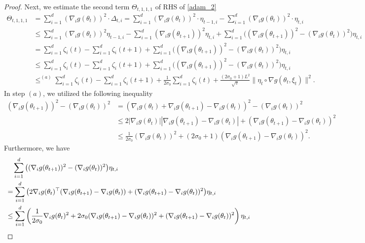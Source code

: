 \documentclass[standalone]{article}
\begin{document}
\begin{proof}
Next, we estimate the second term \(\Theta_{t,1,1,1}\) of RHS of \cref{adam_2}
\begin{align*}
\Theta_{t,1,1,1}&=\sum_{i=1}^{d}(\nabla_{i}g(\theta_{t}))^{2}\cdot\Delta_{t,i}=\sum_{i=1}^{d}(\nabla_{i}g(\theta_{t}))^{2}\cdot\eta_{{t-1},i}-\sum_{i=1}^{d}(\nabla_{i}g(\theta_{t}))^{2}\cdot\eta_{t,i}\\&\le \sum_{i=1}^{d}(\nabla_{i}g(\theta_{t}))^{2}\eta_{{t-1},i}-\sum_{i=1}^{d}(\nabla_{i}g(\theta_{t+1}))^{2}\eta_{t,i}+\sum_{i=1}^{d}\big((\nabla_{i}g(\theta_{t+1}))^{2}-(\nabla_{i}g(\theta_{t}))^{2}\big)\eta_{t,i}\\&=\sum_{i=1}^{d}\zeta_{i}(t)-\sum_{i=1}^{d}\zeta_{i}(t+1)+\sum_{i=1}^{d}\big((\nabla_{i}g(\theta_{t+1}))^{2}-(\nabla_{i}g(\theta_{t}))^{2}\big)\eta_{t,i}\\&\le \sum_{i=1}^{d}\zeta_{i}(t)-\sum_{i=1}^{d}\zeta_{i}(t+1)+\sum_{i=1}^{d}\big((\nabla_{i}g(\theta_{t+1}))^{2}-(\nabla_{i}g(\theta_{t}))^{2}\big)\eta_{t,i}\\&\mathop{\le}^{(a)} \sum_{i=1}^{d}\zeta_{i}(t)-\sum_{i=1}^{d}\zeta_{i}(t+1)+\frac{1}{2\sigma_{0}}\sum_{i=1}^{d}\zeta_{i}(t)+\frac{(2\sigma_{0}+1) L^{2}}{\sqrt{v}}\|\eta_t\circ \nabla g(\theta_{t},\xi_{t})\|^{2}.
\end{align*}
In step $(a)$, we utilized the following inequality
\begin{align*}
(\nabla_{i}g(\theta_{t+1}))^{2}-(\nabla_{i}g(\theta_{t}))^{2}&= (\nabla_{i}g(\theta_{t})+\nabla_{i}g(\theta_{t+1})-\nabla_{i}g(\theta_{t}))^{2}-(\nabla_{i}g(\theta_{t}))^{2}\\&\le 2|\nabla_{i}g(\theta_{t})||\nabla_{i}g(\theta_{t+1})-\nabla_{i}g(\theta_{t})|+(\nabla_{i}g(\theta_{t+1})-\nabla_{i}g(\theta_{t}))^{2}\\&\le \frac{1}{2\sigma_{0}}(\nabla_{i}g(\theta_{t}))^{2}+(2\sigma_{0}+1)(\nabla_{i}g(\theta_{t+1})-\nabla_{i}g(\theta_{t}))^{2}.
\end{align*}
Furthermore, we have
\begin{align*}
&\quad \sum_{i=1}^{d}\big((\nabla_{i}g(\theta_{t+1}))^{2}-(\nabla_{i}g(\theta_{t}))^{2}\big)\eta_{t,i} \notag \\
& =\sum_{i=1}^{d}\big(2\nabla_{i} g(\theta_{t})^{\top}(\nabla_i g(\theta_{t+1})-\nabla_i g(\theta_{t}))+(\nabla_{i}g(\theta_{t+1})-\nabla_{i}g(\theta_{t}))^{2}\big)\eta_{t,i}\\
& \leq \sum_{i=1}^{d}\left(\frac{1}{2\sigma_0}\nabla_{i} g(\theta_{t})^{2} + 2\sigma_0(\nabla_i g(\theta_{t+1})-\nabla_i g(\theta_{t}))^2+(\nabla_{i}g(\theta_{t+1})-\nabla_{i}g(\theta_{t}))^{2} \right)\eta_{t,i} \\

\end{align*}
\end{proof}
\end{document}
